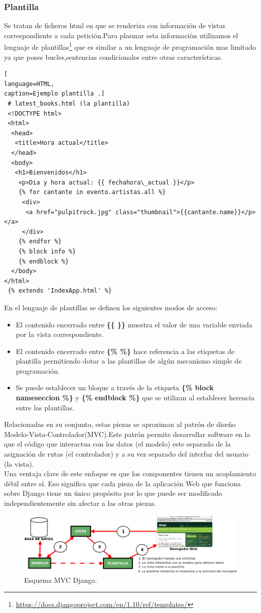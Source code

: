 \subsubsection*{Plantilla}
Se tratan de ficheros html en que se renderiza con información de vistas correspondiente a cada petición.Para plasmar esta información utilizamos el lenguaje de plantillas\footnote{\url{https://docs.djangoproject.com/en/1.10/ref/templates/}} que es similar a un lenguaje de programación mas limitado ya que posee bucles,sentencias condicionales entre otras características.
\begin{lstlisting}[
language=HTML,
caption=Ejemplo plantilla .]
 # latest_books.html (la plantilla)
 <!DOCTYPE html>
 <html>
  <head>
   <title>Hora actual</title>
  </head>
  <body>
   <h1>Bienvenidos</h1>
    <p>Dia y hora actual: {{ fechahora\_actual }}</p>
    {% for cantante in evento.artistas.all %}
     <div>
      <a href="pulpitrock.jpg" class="thumbnail">{{cantante.name}}</p></a>
     </div>
    {% endfor %}
    {% block info %}
    {% endblock %}
  </body>    
</html>
 {% extends 'IndexApp.html' %}
\end{lstlisting}
En el lenguaje de plantillas se definen los siguientes modos de acceso:
\begin{itemize}
\item El contenido encerrado entre \textbf{\{\{ \}\}} muestra el valor de una variable enviada por la vista correspondiente.
\item El contenido encerrado entre \textbf{\{\% \%\}} hace referencia a las etiquetas de plantilla permitiendo dotar a las plantillas de algún mecanismo simple de programación.
\item Se puede establecer un bloque a través de la etiqueta \textbf{\{\% block nameseccion \%\}} y \textbf{\{\% endblock \%\}} que se utilizan al establecer herencia entre las plantillas.
\end{itemize}
Relacionadas en su conjunto, estas piezas se aproximan al patrón de diseño Modelo-Vista-Controlador(MVC).Este patrón permite desarrollar software en la que el código que interactua con los datos (el modelo) este separado de la asignación de rutas (el controlador) y a su vez separado del interfaz del usuario (la vista).
\\Una ventaja clave de este enfoque es que los componentes tienen un acoplamiento débil entre sí. Eso significa que cada pieza de la aplicación Web que funciona sobre Django tiene un único propósito por lo que puede ser modificado independientemente sin afectar a las otras piezas.
\begin{figure}[!h]
\begin{center}
   \includegraphics[width=0.8\linewidth]{Figures/esquemaDjango}
	\decoRule
	\caption[Esquema MVC Django.]{Esquema MVC Django.}
\label{fig:esquemaDjango}
\end{center}
\end{figure}
